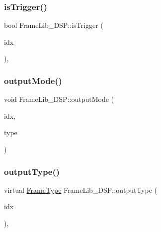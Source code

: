 \subsubsection{\texorpdfstring{is\+Trigger()}{isTrigger()}}
{\footnotesize\ttfamily bool Frame\+Lib\+\_\+\+D\+S\+P\+::is\+Trigger (\begin{DoxyParamCaption}\item[{unsigned long}]{idx }\end{DoxyParamCaption})\hspace{0.3cm}{\ttfamily [inline]}, {\ttfamily [protected]}}

\mbox{\label{class_frame_lib___d_s_p_a82ba080c4038eede7bae208555df1780}} 
\subsubsection{\texorpdfstring{output\+Mode()}{outputMode()}}
{\footnotesize\ttfamily void Frame\+Lib\+\_\+\+D\+S\+P\+::output\+Mode (\begin{DoxyParamCaption}\item[{unsigned long}]{idx,  }\item[{\hyperlink{_frame_lib___types_8h_ad495a9f61af7fff07d7e97979d1ab854}{Frame\+Type}}]{type }\end{DoxyParamCaption})\hspace{0.3cm}{\ttfamily [protected]}}

\mbox{\label{class_frame_lib___d_s_p_aaffa4da5531641a7da9f85e93d3440f0}} 
\subsubsection{\texorpdfstring{output\+Type()}{outputType()}}
{\footnotesize\ttfamily virtual \hyperlink{_frame_lib___types_8h_ad495a9f61af7fff07d7e97979d1ab854}{Frame\+Type} Frame\+Lib\+\_\+\+D\+S\+P\+::output\+Type (\begin{DoxyParamCaption}\item[{unsigned long}]{idx }\end{DoxyParamCaption})\hspace{0.3cm}{\ttfamily [inline]}, {\ttfamily [virtual]}}



